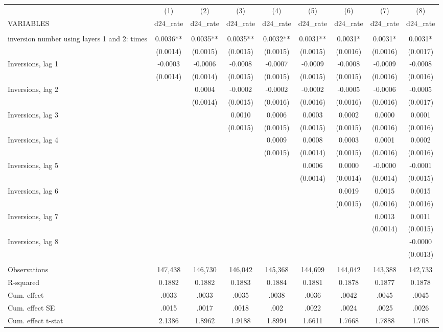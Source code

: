 \begin{tabular}{lcccccccc} \hline
 & (1) & (2) & (3) & (4) & (5) & (6) & (7) & (8) \\
VARIABLES & d24\_rate & d24\_rate & d24\_rate & d24\_rate & d24\_rate & d24\_rate & d24\_rate & d24\_rate \\ \hline
 &  &  &  &  &  &  &  &  \\
inversion number using layers 1 and 2: times & 0.0036** & 0.0035** & 0.0035** & 0.0032** & 0.0031** & 0.0031* & 0.0031* & 0.0031* \\
 & (0.0014) & (0.0015) & (0.0015) & (0.0015) & (0.0015) & (0.0016) & (0.0016) & (0.0017) \\
Inversions, lag 1 & -0.0003 & -0.0006 & -0.0008 & -0.0007 & -0.0009 & -0.0008 & -0.0009 & -0.0008 \\
 & (0.0014) & (0.0014) & (0.0015) & (0.0015) & (0.0015) & (0.0015) & (0.0016) & (0.0016) \\
Inversions, lag 2 &  & 0.0004 & -0.0002 & -0.0002 & -0.0002 & -0.0005 & -0.0006 & -0.0005 \\
 &  & (0.0014) & (0.0015) & (0.0016) & (0.0016) & (0.0016) & (0.0016) & (0.0017) \\
Inversions, lag 3 &  &  & 0.0010 & 0.0006 & 0.0003 & 0.0002 & 0.0000 & 0.0001 \\
 &  &  & (0.0015) & (0.0015) & (0.0015) & (0.0015) & (0.0016) & (0.0016) \\
Inversions, lag 4 &  &  &  & 0.0009 & 0.0008 & 0.0003 & 0.0001 & 0.0002 \\
 &  &  &  & (0.0015) & (0.0014) & (0.0015) & (0.0016) & (0.0016) \\
Inversions, lag 5 &  &  &  &  & 0.0006 & 0.0000 & -0.0000 & -0.0001 \\
 &  &  &  &  & (0.0014) & (0.0014) & (0.0014) & (0.0015) \\
Inversions, lag 6 &  &  &  &  &  & 0.0019 & 0.0015 & 0.0015 \\
 &  &  &  &  &  & (0.0015) & (0.0016) & (0.0016) \\
Inversions, lag 7 &  &  &  &  &  &  & 0.0013 & 0.0011 \\
 &  &  &  &  &  &  & (0.0014) & (0.0015) \\
Inversions, lag 8 &  &  &  &  &  &  &  & -0.0000 \\
 &  &  &  &  &  &  &  & (0.0013) \\
 &  &  &  &  &  &  &  &  \\
Observations & 147,438 & 146,730 & 146,042 & 145,368 & 144,699 & 144,042 & 143,388 & 142,733 \\
R-squared & 0.1882 & 0.1882 & 0.1883 & 0.1884 & 0.1881 & 0.1878 & 0.1877 & 0.1878 \\
Cum. effect & .0033 & .0033 & .0035 & .0038 & .0036 & .0042 & .0045 & .0045 \\
Cum. effect SE & .0015 & .0017 & .0018 & .002 & .0022 & .0024 & .0025 & .0026 \\
 Cum. effect t-stat & 2.1386 & 1.8962 & 1.9188 & 1.8994 & 1.6611 & 1.7668 & 1.7888 & 1.708 \\ \hline
\end{tabular}
